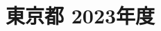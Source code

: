 \documentclass[../../hsm_tok_q.tex]{subfiles}
\begin{document}
    \section{東京都 2023年度}
    \subsection{　}
    
    \newpage
    \subsection{　}
    
    \newpage
    \subsection{　}
    
    \newpage
    \subsection{　}
    
    \newpage
    \subsection{　}
    
\end{document}
